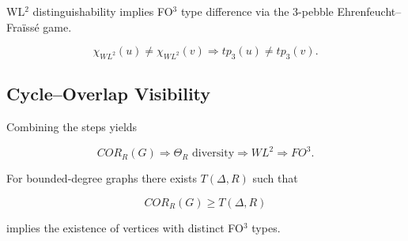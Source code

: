 WL\(^2\) distinguishability implies FO\(^3\) type difference via
the \(3\)-pebble Ehrenfeucht--Fra\"iss\'e game.

\[
\chi_{WL^2}(u) \neq \chi_{WL^2}(v)
\Rightarrow
tp_3(u) \neq tp_3(v).
\]

\subsection{Cycle--Overlap Visibility}

Combining the steps yields

\[
COR_R(G)
\Rightarrow
\Theta_R \text{ diversity}
\Rightarrow
WL^2
\Rightarrow
FO^3.
\]

\begin{theorem}
For bounded-degree graphs there exists \(T(\Delta,R)\) such that

\[
COR_R(G) \ge T(\Delta,R)
\]

implies the existence of vertices with distinct FO\(^3\) types.
\end{theorem}
